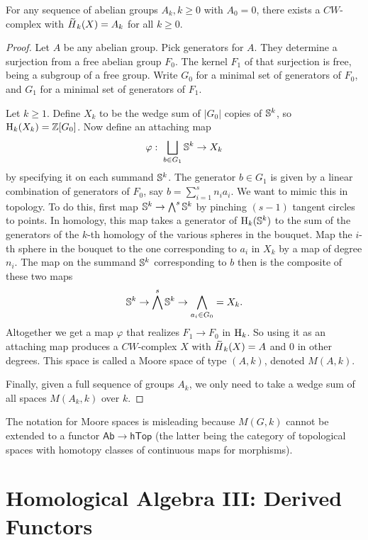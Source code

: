 \begin{prop}
    For any sequence of abelian groups $A_k,k\geq 0$ with $A_0=0$, there exists a $CW$-complex with $\wt{H}_k(X)=A_k$ for all $k\geq 0$.
\end{prop}
\begin{proof}
    Let $A$ be any abelian group. Pick generators for $A$. They determine a surjection from a free abelian group $F_0$. The kernel $F_1$ of that surjection is free, being a subgroup of a free group. Write $G_0$ for a minimal set of generators of $F_0$, and $G_1$ for a minimal set of generators of $F_1$.

    Let $k\geq 1$. Define $X_k$ to be the wedge sum of $|G_0|$ copies of $\mathbb{S}^k$, so $\mathrm{H}_k(X_k)=\mathbb{Z}[G_0]$. Now define an attaching map
    \[\varphi:\;\bigsqcup_{b\in G_1}\mathbb{S}^k\to X_k\]
    by specifying it on each summand $\mathbb{S}^k$. The generator $b\in G_1$ is given by a linear combination of generators of $F_0$, say $b=\sum_{i=1}^s n_i a_i$. We want to mimic this in topology. To do this, first map $\mathbb{S}^k\to \bigwedge^s \mathbb{S}^k$ by pinching $(s-1)$ tangent circles to points. In homology, this map takes a generator of $\mathrm{H}_k(\mathbb{S}^k)$ to the sum of the generators of the $k$-th homology of the various spheres in the bouquet. Map the $i$-th sphere in the bouquet to the one corresponding to $a_i$ in $X_k$ by a map of degree $n_i$. The map on the summand $\mathbb{S}^k$ corresponding to $b$ then is the composite of these two maps
    \[\mathbb{S}^k\to \bigwedge^s \mathbb{S}^k\to \bigwedge_{a_i\in G_0}=X_k.\]
    Altogether we get a map $\varphi$ that realizes $F_1\to F_0$ in $\mathrm{H}_k$. So using it as an attaching map produces a $CW$-complex $X$ with $\wt{H}_k(X)=A$ and $0$ in other degrees. This space is called a Moore space of type $(A,k)$, denoted $M(A,k)$.

    Finally, given a full sequence of groups $A_k$, we only need to take a wedge sum of all spaces $M(A_k,k)$ over $k$.
\end{proof}

\begin{rem}
    The notation for Moore spaces is misleading because $M(G,k)$ cannot be extended to a functor $\mathsf{Ab}\to \mathsf{hTop}$ (the latter being the category of topological spaces with homotopy classes of continuous maps for morphisms).
\end{rem}




\clearpage
\chapter{Homological Algebra III: Derived Functors}

